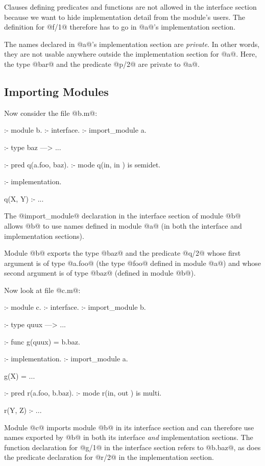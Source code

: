 Clauses defining predicates and functions are not allowed in the
interface section because we want to hide implementation detail from the
module's users.  The definition for @f/1@ therefore has to go in
@a@'s implementation section.

The names declared in @a@'s implementation section are \emph{private}.
In other words, they are not usable anywhere outside the implementation
section for @a@.  Here, the type @bar@ and the predicate @p/2@ are
private to @a@.

\subsection{Importing Modules}

Now consider the file @b.m@:
\begin{myverbatim}
:- module b.
:- interface.
:- import_module a.

:- type baz ---> ...

:- pred q(a.foo, baz).
:- mode q(in,    in ) is semidet.

:- implementation.

q(X, Y) :- ...
\end{myverbatim}
The @import_module@ declaration in the interface section of module @b@
allows @b@ to use names defined in module @a@ (in both the interface and
implementation sections).

Module @b@ exports the type @baz@ and the predicate @q/2@ whose first
argument is of type @a.foo@ (\ie the type @foo@ defined in module @a@)
and whose second argument is of type @baz@ (defined in module @b@).

Now look at file @c.m@:
\begin{myverbatim}
:- module c.
:- interface.
:- import_module b.

:- type quux ---> ...

:- func g(quux) = b.baz.

:- implementation.
:- import_module a.

g(X) = ...

:- pred r(a.foo, b.baz).
:- mode r(in,    out  ) is multi.

r(Y, Z) :- ...
\end{myverbatim}
Module @c@ imports module @b@ in its interface section and can therefore
use names exported by @b@ in both its interface \emph{and} implementation
sections.  The function declaration for @g/1@ in the interface section
refers to @b.baz@, as does the predicate declaration for @r/2@ in the
implementation section.

